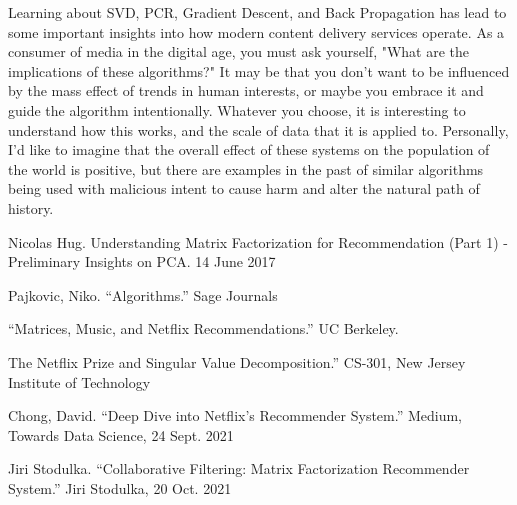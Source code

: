\documentclass[11pt,a4paper]{article}
\begin{document}
Learning about SVD, PCR, Gradient Descent, and Back Propagation has lead to some important insights into how modern content delivery services operate. As a consumer of media in the digital age, you must ask yourself, "What are the implications of these algorithms?" It may be that you don't want to be influenced by the mass effect of trends in human interests, or maybe you embrace it and guide the algorithm intentionally. Whatever you choose, it is interesting to understand how this works, and the scale of data that it is applied to. Personally, I'd like to imagine that the overall effect of these systems on the population of the world is positive, but there are examples in the past of similar algorithms being used with malicious intent to cause harm and alter the natural path of history.



\newpage
\begin{thebibliography}{widest entry}
     Nicolas Hug. Understanding Matrix Factorization for Recommendation (Part 1) - Preliminary Insights on PCA. 14 June 2017 %

    Pajkovic, Niko. “Algorithms.” Sage Journals %

    “Matrices, Music, and Netflix Recommendations.” UC Berkeley. %

     The Netflix Prize and Singular Value Decomposition.” CS-301, New Jersey Institute of Technology %

     Chong, David. “Deep Dive into Netflix's Recommender System.” Medium, Towards Data Science, 24 Sept. 2021 %

     Jiri Stodulka. “Collaborative Filtering: Matrix Factorization Recommender System.” Jiri Stodulka, 20 Oct. 2021 %

\end{thebibliography}
\end{document}
